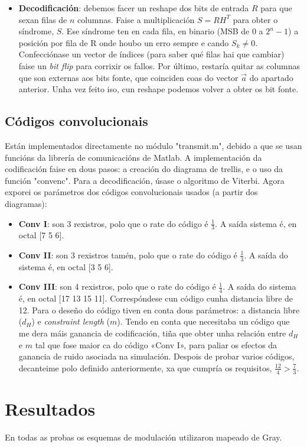 \documentclass[
	10pt, %
	spanish, %
]{fphw}
\begin{document}
\begin{itemize}
\item \textbf{Decodificación}:
debemos facer un reshape dos bits de entrada $R$ para que sexan filas de $n$ columnas. Faise a multiplicación $S = RH^T$ para obter o síndrome, $S$.
Ese síndrome ten en cada fila, en binario (MSB de $0$ a $2^n -1$) a posición por fila de R onde houbo un erro sempre e cando $S_k \neq 0$. Confecciónase un vector de índices (para saber qué filas hai que cambiar) faise un \textit{bit flip} para corrixir os fallos. Por último, restaría quitar as columnas que son externas aos bits fonte, que coinciden coas do vector $\vec{a}$ do apartado anterior. Unha vez feito iso, cun reshape podemos volver a obter os bit fonte.
\end{itemize}
\subsection*{Códigos convolucionais}
Están implementados directamente no módulo "transmit.m", debido a que se usan funcións da librería de comunicacións de Matlab. A implementación da codificación faise en dous pasos: a creación do diagrama de trellis, e o uso da función "convenc". Para a decodificación, úsase o algoritmo de Viterbi. Agora exporei os parámetros dos códigos convolucionais usados (a partir dos diagramas):
\begin{itemize}
\item \textbf{Conv I}:
son 3 rexistros, polo que o rate do código é $\frac{1}{3}$. A saída sistema é, en octal [7 5 6].
\item \textbf{Conv II}:
son 3 rexistros tamén, polo que o rate do código é $\frac{1}{3}$. A saída do sistema é, en octal [3 5 6].
\item \textbf{Conv III}:
son 4 rexistros, polo que o rate do código é $\frac{1}{4}$. A saída do sistema é, en octal [17 13 15 11]. Correspóndese cun código cunha distancia libre de 12.
Para o deseño do código tiven en conta dous parámetros: a distancia libre ($d_H$) e \textit{constraint length} ($m$). Tendo en conta que necesitaba un código que me dera máis ganancia de codificación,
tiña que obter unha relación entre $d_H$ e $m$ tal que fose maior ca do código «Conv I», para paliar os efectos da ganancia de ruido asociada na simulación. Despois de probar varios códigos, decanteime polo definido anteriormente,
xa que cumpría os requisitos, $\frac{12}{4} > \frac{7}{3}$.
\end{itemize}
\section*{Resultados}
En todas as probas os esquemas de modulación utilizaron mapeado de Gray.
\end{document}
